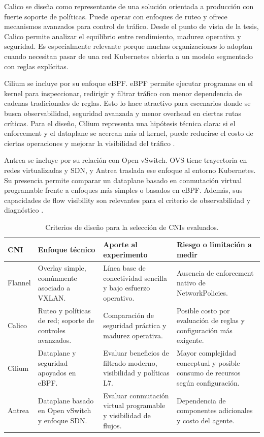 \documentclass[journal]{IEEEtran}
\begin{document}
Calico se diseña como representante de una solución orientada a producción con fuerte soporte de políticas. Puede operar con enfoques de ruteo y ofrece mecanismos avanzados para control de tráfico. Desde el punto de vista de la tesis, Calico permite analizar el equilibrio entre rendimiento, madurez operativa y seguridad. Es especialmente relevante porque muchas organizaciones lo adoptan cuando necesitan pasar de una red Kubernetes abierta a un modelo segmentado con reglas explícitas.

Cilium se incluye por su enfoque eBPF. eBPF permite ejecutar programas en el kernel para inspeccionar, redirigir y filtrar tráfico con menor dependencia de cadenas tradicionales de reglas. Esto lo hace atractivo para escenarios donde se busca observabilidad, seguridad avanzada y menor overhead en ciertas rutas críticas. Para el diseño, Cilium representa una hipótesis técnica clara: si el enforcement y el dataplane se acercan más al kernel, puede reducirse el costo de ciertas operaciones y mejorar la visibilidad del tráfico \cite{ref27}.

Antrea se incluye por su relación con Open vSwitch. OVS tiene trayectoria en redes virtualizadas y SDN, y Antrea traslada ese enfoque al entorno Kubernetes. Su presencia permite comparar un dataplane basado en conmutación virtual programable frente a enfoques más simples o basados en eBPF. Además, sus capacidades de flow visibility son relevantes para el criterio de observabilidad y diagnóstico \cite{ref23}.

\begin{table}[htbp]
\centering
\scriptsize
\caption{Criterios de diseño para la selección de CNIs evaluados.}
\label{tab:cni-diseno-comparativo}
\begin{tabularx}{\textwidth}{|Y|Y|Y|Y|}
\hline
\textbf{CNI} & \textbf{Enfoque técnico} & \textbf{Aporte al experimento} & \textbf{Riesgo o limitación a medir} \\
\hline
Flannel & Overlay simple, comúnmente asociado a VXLAN. & Línea base de conectividad sencilla y bajo esfuerzo operativo. & Ausencia de enforcement nativo de NetworkPolicies. \\
\hline
Calico & Ruteo y políticas de red; soporte de controles avanzados. & Comparación de seguridad práctica y madurez operativa. & Posible costo por evaluación de reglas y configuración más exigente. \\
\hline
Cilium & Dataplane y seguridad apoyados en eBPF. & Evaluar beneficios de filtrado moderno, visibilidad y políticas L7. & Mayor complejidad conceptual y posible consumo de recursos según configuración. \\
\hline
Antrea & Dataplane basado en Open vSwitch y enfoque SDN. & Evaluar conmutación virtual programable y visibilidad de flujos. & Dependencia de componentes adicionales y costo del agente. \\
\hline
\end{tabularx}
\end{table}
\end{document}
